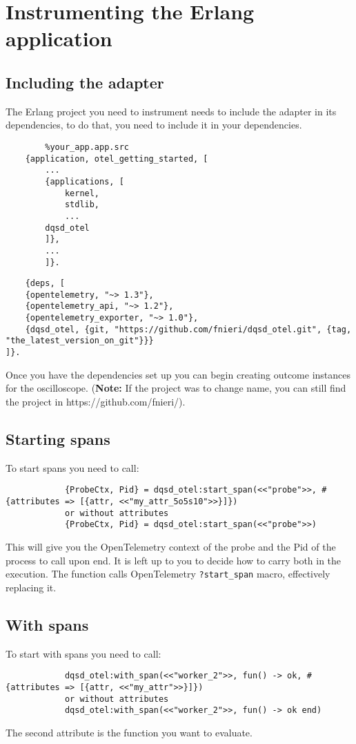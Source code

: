 \section{Instrumenting the Erlang application} \label{app:instr_app}
    \subsection{Including the adapter}

    The Erlang project you need to instrument needs to include the adapter in its dependencies, to do that, you need to include it in your dependencies.

    \begin{verbatim}
        %your_app.app.src
    {application, otel_getting_started, [
        ...
        {applications, [
            kernel,
            stdlib,
            ...
        dqsd_otel
        ]},
        ...
        ]}.
    \end{verbatim}

    \begin{verbatim}
    {deps, [
    {opentelemetry, "~> 1.3"},
    {opentelemetry_api, "~> 1.2"},
    {opentelemetry_exporter, "~> 1.0"},
    {dqsd_otel, {git, "https://github.com/fnieri/dqsd_otel.git", {tag, "the_latest_version_on_git"}}}
]}.
    \end{verbatim} 
    Once you have the dependencies set up you can begin creating outcome instances for the oscilloscope.
    (\textbf{Note:} If the project was to change name, you can still find the project in https://github.com/fnieri/).

    \subsection{Starting spans}
        To start spans you need to call: 
        \begin{verbatim}
            {ProbeCtx, Pid} = dqsd_otel:start_span(<<"probe">>, #{attributes => [{attr, <<"my_attr_5o5s10">>}]})
            or without attributes
            {ProbeCtx, Pid} = dqsd_otel:start_span(<<"probe">>)
        \end{verbatim}
        This will give you the OpenTelemetry context of the probe and the Pid of the process to call upon end. It is left up to you to decide how to carry both in the execution.
        The function calls OpenTelemetry \texttt{?start\_span} macro, effectively replacing it.
    
    \subsection{With spans}
        To start with spans you need to call:
        \begin{verbatim}
            dqsd_otel:with_span(<<"worker_2">>, fun() -> ok, #{attributes => [{attr, <<"my_attr">>}]})
            or without attributes
            dqsd_otel:with_span(<<"worker_2">>, fun() -> ok end)
        \end{verbatim}
        The second attribute is the function you want to evaluate.

